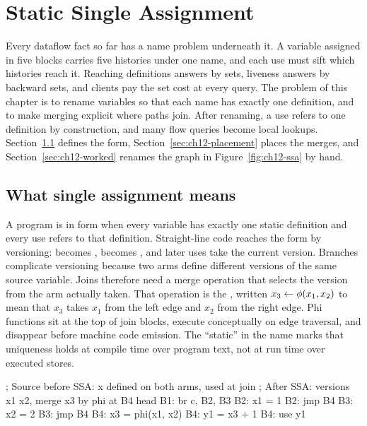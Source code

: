 \chapter{Static Single Assignment}
\label{ch:ch12-static-single-assignment}

Every dataflow fact so far has a name problem underneath it.
A variable assigned in five blocks carries five histories under one name, and each use must sift which histories reach it.
Reaching definitions answers by sets, liveness answers by backward sets, and clients pay the set cost at every query.
The problem of this chapter is to rename variables so that each name has exactly one definition, and to make merging explicit where paths join.
After renaming, a use refers to one definition by construction, and many flow queries become local lookups.
Section~\ref{sec:ch12-meaning} defines the form, Section~\ref{sec:ch12-placement} places the merges, and Section~\ref{sec:ch12-worked} renames the graph in Figure~\ref{fig:ch12-ssa} by hand.

\section{What single assignment means}
\label{sec:ch12-meaning}

A program is in  form when every variable has exactly one static definition and every use refers to that definition.
Straight-line code reaches the form by versioning:  becomes ,  becomes , and later uses take the current version.
Branches complicate versioning because two arms define different versions of the same source variable.
Joins therefore need a merge operation that selects the version from the arm actually taken.
That operation is the , written $x_3 \gets \phi(x_1,x_2)$ to mean that $x_3$ takes $x_1$ from the left edge and $x_2$ from the right edge.
Phi functions sit at the top of join blocks, execute conceptually on edge traversal, and disappear before machine code emission.
The \enquote{static} in the name marks that uniqueness holds at compile time over program text, not at run time over executed stores.

\begin{irlisting}
; Source before SSA: x defined on both arms, used at join
; After SSA: versions x1 x2, merge x3 by phi at B4 head
B1: br c, B2, B3
B2: x1 = 1
B2: jmp B4
B3: x2 = 2
B3: jmp B4
B4: x3 = phi(x1, x2)
B4: y1 = x3 + 1
B4: use y1
\end{irlisting}

